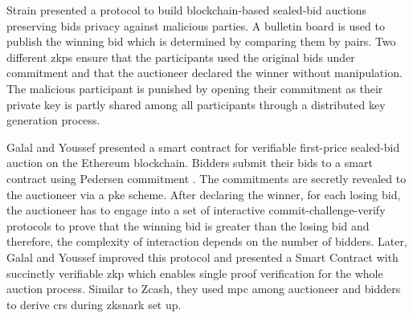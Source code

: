 Strain \cite{blass2018strain} presented a protocol to build
blockchain-based sealed-bid auctions preserving bids privacy against
malicious parties. A bulletin board is used to publish the
winning bid which is determined by comparing them by pairs. Two different \glspl{zkp} ensure that the participants used the original bids under commitment and that the auctioneer declared the winner without manipulation. The malicious participant is punished by opening their commitment as their private key is partly shared among all participants through a distributed key generation process.

Galal and Youssef \cite{galal2018verifiable} presented a smart contract for verifiable first-price sealed-bid auction on the Ethereum blockchain. Bidders submit their bids to a smart contract using Pedersen commitment \cite{pedersen1991non}. The commitments are secretly revealed to the auctioneer via a \gls{pke} scheme. After declaring the winner, for each losing bid, the auctioneer has to engage into a set of interactive commit-challenge-verify protocols to prove that the winning bid is greater than the losing bid and therefore, the complexity of interaction depends on the number of bidders. 
Later, Galal and Youssef \cite{galal2018succinctly} improved this protocol and presented a Smart Contract with succinctly verifiable \gls{zkp} which enables single proof verification for the whole auction process. Similar to Zcash, they used \gls{mpc} among auctioneer and bidders to derive \gls{crs} during \gls{zksnark} set up.



